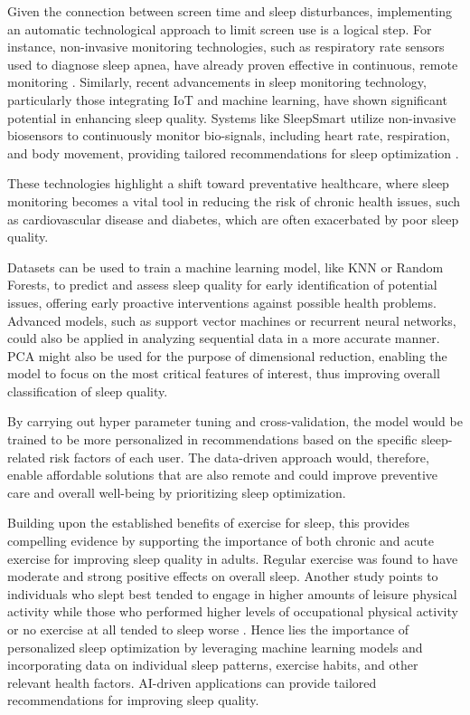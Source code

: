 \documentclass[conference]{IEEEtran}
\begin{document}
Given the connection between screen time and sleep disturbances, implementing an automatic technological approach to limit screen use is a logical step. For instance, non-invasive monitoring technologies, such as respiratory rate sensors used to diagnose sleep apnea, have already proven effective in continuous, remote monitoring \cite{Cinel2020}. Similarly, recent advancements in sleep monitoring technology, particularly those integrating IoT and machine learning, have shown significant potential in enhancing sleep quality. Systems like SleepSmart utilize non-invasive biosensors to continuously monitor bio-signals, including heart rate, respiration, and body movement, providing tailored recommendations for sleep optimization \cite{Gamel2024}.

These technologies highlight a shift toward preventative healthcare, where sleep monitoring becomes a vital tool in reducing the risk of chronic health issues, such as cardiovascular disease and diabetes, which are often exacerbated by poor sleep quality.

Datasets can be used to train a machine learning model, like KNN or Random Forests, to predict and assess sleep quality for early identification of potential issues, offering early proactive interventions against possible health problems. Advanced models, such as support vector machines or recurrent neural networks, could also be applied in analyzing sequential data in a more accurate manner. PCA might also be used for the purpose of dimensional reduction, enabling the model to focus on the most critical features of interest, thus improving overall classification of sleep quality. 

By carrying out hyper parameter tuning and cross-validation, the model would be trained to be more personalized in recommendations based on the specific sleep-related risk factors of each user. The data-driven approach would, therefore, enable affordable solutions that are also remote and could improve preventive care and overall well-being by prioritizing sleep optimization.

Building upon the established benefits of exercise for sleep, this provides compelling evidence by supporting the importance of both chronic and acute exercise for improving sleep quality in adults\cite{Dolezal_2017}.  Regular exercise was found to have  moderate and strong positive effects on overall sleep. Another study points to  individuals who slept best tended to engage in higher amounts of leisure physical activity while those who performed higher levels of occupational physical activity or no exercise at all tended to sleep worse \cite{wennman2014physical}.  Hence lies the importance of personalized sleep optimization by leveraging machine learning models and incorporating data on individual sleep patterns, exercise habits, and other relevant health factors. AI-driven applications can provide tailored recommendations for improving sleep quality.
\end{document}
